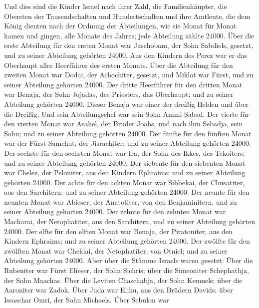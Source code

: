 Und dies sind die Kinder Israel nach ihrer Zahl, die
Familienhäupter, die Obersten der Tausendschaften und Hundertschaften
und ihre Amtleute, die dem König dienten nach der Ordnung der
Abteilungen, wie sie Monat für Monat kamen und gingen, alle Monate des
Jahres; jede Abteilung zählte 24000.  Über die erste
Abteilung für den ersten Monat war Jaschobam, der Sohn Sabdiels,
gesetzt, und zu seiner Abteilung gehörten 24000.  Aus den
Kindern des Perez war er das Oberhaupt aller Heerführer des ersten
Monats.  Über die Abteilung für den zweiten Monat war
Dodai, der Achochiter, gesetzt, und Miklot war Fürst, und zu seiner
Abteilung gehörten 24000.  Der dritte Heerführer für den
dritten Monat war Benaja, der Sohn Jojadas, des Priesters, das
Oberhaupt; und zu seiner Abteilung gehörten 24000.  Dieser
Benaja war einer der dreißig Helden und über die Dreißig. Und sein
Abteilungschef war sein Sohn Ammi-Sabad.  Der vierte für
den vierten Monat war Asahel, der Bruder Joabs, und nach ihm Sebadja,
sein Sohn; und zu seiner Abteilung gehörten 24000.  Der
fünfte für den fünften Monat war der Fürst Samchut, der Jisrachiter; und
zu seiner Abteilung gehörten 24000.  Der sechste für den
sechsten Monat war Ira, der Sohn des Ikkes, des Tekoiters; und zu seiner
Abteilung gehörten 24000.  Der siebente für den siebenten
Monat war Chelez, der Peloniter, aus den Kindern Ephraims; und zu seiner
Abteilung gehörten 24000.  Der achte für den achten Monat
war Sibbekai, der Chusatiter, aus den Sarchitern; und zu seiner
Abteilung gehörten 24000.  Der neunte für den neunten
Monat war Abieser, der Anatotiter, von den Benjaminitern, und zu seiner
Abteilung gehörten 24000.  Der zehnte für den zehnten
Monat war Macharai, der Netophatiter, aus den Sarchitern, und zu seiner
Abteilung gehörten 24000.  Der elfte für den elften Monat
war Benaja, der Piratoniter, aus den Kindern Ephraims; und zu seiner
Abteilung gehörten 24000.  Der zwölfte für den zwölften
Monat war Cheldai, der Netophatiter, von Otniel; und zu seiner Abteilung
gehörten 24000.  Aber über die Stämme Israels waren
gesetzt: Über die Rubeniter war Fürst Elieser, der Sohn Sichris; über
die Simeoniter Schephathja, der Sohn Maachas.  Über die
Leviten Chaschabja, der Sohn Kemuels; über die Aaroniter war Zadok.
 Über Juda war Elihu, aus den Brüdern Davids; über
Issaschar Omri, der Sohn Michaels.  Über Sebulon war
